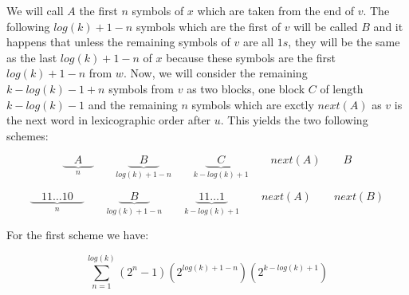 \documentclass[10pt, a4paper]{article}
\theoremstyle{definition}
\begin{document}
We will call $A$ the first $n$ symbols of $x$ which are taken from the end of $v$. The following $log(k) + 1 - n$ symbols which are the first of $v$ will be called $B$ and it happens that unless the remaining symbols of $v$ are all $1s$, 
they will be the same as the last $log(k) + 1 - n$ of $x$ because these symbols are the first $log(k) + 1 - n$ from $w$.
Now, we will consider the remaining $k - log(k) - 1 + n$ symbols from $v$ as two blocks, one block $C$ of length $k - log(k) - 1$ and the remaining $n$ symbols which are exctly $next(A)$ as $v$ is the next word in lexicographic order after $u$.
This yields the two following schemes:

$$\underbrace{\quad A \quad }_{n} \qquad \underbrace{\quad B \quad }_{log(k) + 1 - n}  \qquad \underbrace{\quad C \quad }_{k-log(k)+1} \qquad next(A) \qquad B$$

$$\underbrace{\quad 11\dots10 \quad }_{n} \qquad \underbrace{\quad B \quad }_{log(k) + 1 - n}  \qquad \underbrace{\; 11\dots1 \; }_{k-log(k)+1} \qquad next(A) \qquad next(B)$$

For the first scheme we have:

$$\sum_{n=1}^{log(k)}(2^n - 1)(2^{log(k) + 1 - n})(2^{k - log(k) + 1})$$








\end{document}
